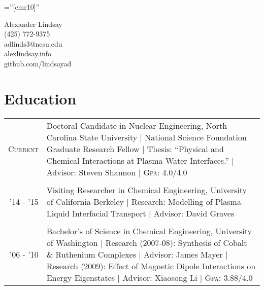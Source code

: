 \documentclass[a4paper,10pt]{article} %
\begin{document}
\pagestyle{empty} %

\font\fb=''[cmr10]'' %

\begin{center}
\Large Alexander Lindsay\\
\normalsize (425) 772-9375\\
adlinds3@ncsu.edu\\
alexlindsay.info\\
github.com/lindsayad\\
\end{center}


\section{Education}

\begin{table}[h]
\begin{tabularx}{\textwidth}{rX}

\textsc{Current} & Doctoral Candidate in Nuclear Engineering, North Carolina State University | National Science Foundation Graduate Research Fellow | Thesis: ``Physical and Chemical Interactions at Plasma-Water Interfaces.'' | Advisor: Steven Shannon | \textsc{Gpa}: 4.0/4.0\\
&\\


\textsc{'14 - '15} & Visiting Researcher in Chemical Engineering, University of California-Berkeley | Research: Modelling of Plasma-Liquid Interfacial Transport | Advisor: David Graves\\
&\\


\textsc{'06 - '10} & Bachelor's of Science in Chemical Engineering, University of Washington | Research (2007-08): Synthesis of Cobalt \& Ruthenium Complexes | Advisor: James Mayer | Research (2009): Effect of Magnetic Dipole Interactions on Energy Eigenstates | Advisor: Xiaosong Li | \textsc{Gpa}: 3.88/4.0\\

\end{tabularx}
\end{table}
\end{document}
